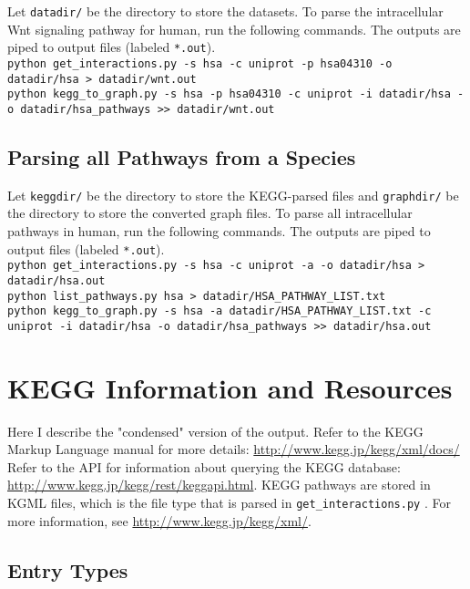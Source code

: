 \documentclass[10pt]{article}
\newcommand{\getinteractions}{\texttt{get\_interactions.py} }
\begin{document}
Let \texttt{datadir/} be the directory to store the datasets.  To parse the intracellular Wnt signaling pathway for human, run the following commands.  The outputs are piped to output files (labeled \texttt{*.out}).\\

{\small 
\noindent \texttt{python get\_interactions.py -s hsa -c uniprot -p hsa04310 -o datadir/hsa > datadir/wnt.out}\\
\noindent \texttt{python kegg\_to\_graph.py -s hsa -p hsa04310 -c uniprot -i datadir/hsa -o datadir/hsa\_pathways >> datadir/wnt.out}
}

\subsection{Parsing all Pathways from a Species}

Let \texttt{keggdir/} be the directory to store the KEGG-parsed files and \texttt{graphdir/} be the directory to store the converted graph files.  To parse all intracellular pathways in human, run the following commands.  The outputs are piped to output files (labeled \texttt{*.out}).\\

{\small
\noindent \texttt{python get\_interactions.py -s hsa -c uniprot -a -o datadir/hsa > datadir/hsa.out}\\
\noindent \texttt{python list\_pathways.py hsa > datadir/HSA\_PATHWAY\_LIST.txt}\\
\noindent \texttt{python kegg\_to\_graph.py -s hsa -a datadir/HSA\_PATHWAY\_LIST.txt -c uniprot -i datadir/hsa -o datadir/hsa\_pathways >> datadir/hsa.out}
}

\section{KEGG Information and Resources}

Here I describe the "condensed" version of the output.  Refer to the KEGG
Markup Language manual for more details: \url{http://www.kegg.jp/kegg/xml/docs/}
Refer to the API for information about querying the KEGG database:
\url{http://www.kegg.jp/kegg/rest/keggapi.html}.  KEGG pathways are stored in KGML files, which is the file type that is parsed in \getinteractions.  For more information, see \url{http://www.kegg.jp/kegg/xml/}.

\subsection{Entry Types}
\end{document}
